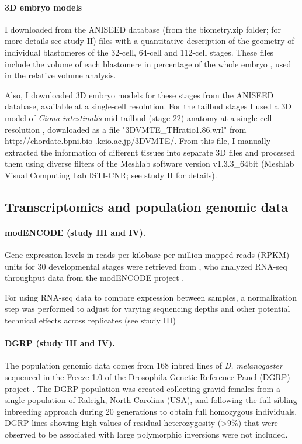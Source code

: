 \paragraph{3D embryo models}

I downloaded from the ANISEED database (from the biometry.zip folder; for more details see study II) files with a quantitative description of the geometry of individual blastomeres of the 32-cell, 64-cell and 112-cell stages. These files include the volume of each blastomere in percentage of the whole embryo \citep{Tassy2006}, used in the relative volume analysis.

Also, I downloaded 3D embryo models for these stages from the ANISEED database, available at a single-cell resolution. 
For the tailbud stages I used a 3D model of \textit{Ciona intestinalis} mid tailbud (stage 22) anatomy at a single cell resolution \citep{Nakamura2012}, downloaded as a file "3DVMTE\_THratio1.86.wrl" from http://chordate.bpni.bio .keio.ac.jp/3DVMTE/.
From this file, I manually extracted the information of different tissues into separate 3D files and processed them using diverse filters of the Meshlab software version v1.3.3\_64bit (Meshlab Visual Computing Lab ISTI-CNR; see study II for details).

\subsection{Transcriptomics and population genomic data}

\paragraph{modENCODE (study III and IV).}

Gene expression levels in reads per kilobase per million mapped reads (RPKM) units for 30 developmental stages were retrieved from \citet{Gelbart2013}, who analyzed RNA-seq throughput data from the modENCODE project \citep{Graveley2011}.

For using RNA-seq data to compare expression between samples, a normalization step was performed to adjust for varying sequencing depths and other potential technical effects across replicates (see study III)

\paragraph{DGRP (study III and IV).}

The population genomic data comes from 168 inbred lines of \textit{D. melanogaster} sequenced in the Freeze 1.0 of the Drosophila Genetic Reference Panel (DGRP) project \citep{Mackay2012}. The DGRP population was created collecting gravid females from a single population of Raleigh, North Carolina (USA), and following the full-sibling inbreeding approach during 20 generations to obtain full homozygous individuals. 
DGRP lines showing high values of residual heterozygosity (>9\%) that were observed to be associated with large polymorphic inversions \citep{Huang2014} were not included.

